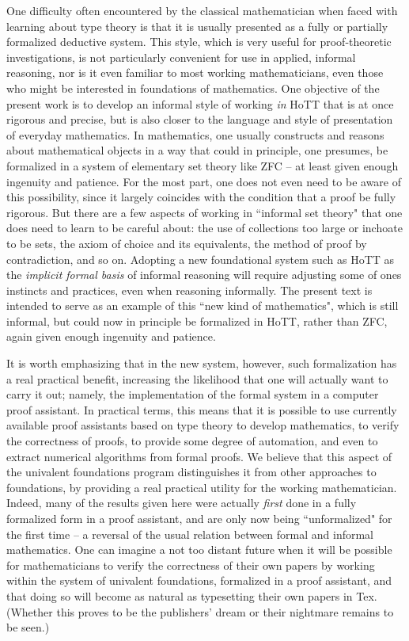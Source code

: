{One difficulty often encountered by the classical mathematician when faced with learning about type theory is that it is usually presented as a fully or partially formalized deductive system.  This style, which is very useful for  proof-theoretic investigations, is not particularly convenient for use in applied, informal reasoning, nor is it even familiar to most working mathematicians, even those who might be interested in foundations of mathematics.  One objective of the present work is to develop an informal style of working \emph{in} HoTT that is at once rigorous and precise, but is also closer to the language and style of presentation of everyday mathematics.    In mathematics, one usually constructs and reasons about mathematical objects in a way that could in principle, one presumes, be formalized in a system of elementary set theory like ZFC -- at least given enough ingenuity and patience.  For the most part, one does not even need to be aware of this possibility, since it largely coincides with the condition that a proof be fully rigorous.  But there are a few aspects of working in ``informal set theory" that one does need to learn to be careful about: the use of collections too large or inchoate to  be sets, the axiom of choice and its equivalents,  the method of proof by contradiction, and so on.  Adopting a new foundational system such as HoTT as the \emph{implicit formal basis} of informal reasoning will require adjusting some of ones instincts and practices, even when reasoning informally.  The present text is intended to serve as an example of this ``new kind of mathematics", which is still informal, but could now in principle be formalized in HoTT, rather than ZFC, again given enough ingenuity and patience.

It is worth emphasizing that in the new system, however, such formalization has a real practical benefit, increasing the likelihood that one will actually want to carry it out; namely, the implementation of the formal system in a computer proof assistant.  In practical terms, this means that it is possible to use currently available proof assistants based on type theory to develop mathematics, to verify the correctness of proofs, to provide some degree of automation, and even to extract numerical algorithms from formal proofs.  We believe that this aspect of the univalent foundations program distinguishes it from other approaches to foundations, by providing a real practical utility for the working mathematician. Indeed, many of the results given here were actually \emph{first} done in a fully formalized form in a proof assistant, and are only now being ``unformalized" for the first time -- a reversal of the usual relation between formal and informal mathematics.   One can imagine a not too distant future when it will be possible for mathematicians  to verify the correctness of their own papers by working within the system of univalent foundations, formalized in a proof assistant, and that doing so will become as natural as typesetting their own papers in Tex. (Whether this proves to be the publishers' dream or their nightmare  remains to be seen.) 

}
